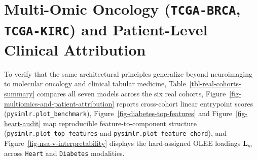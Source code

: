 \documentclass[
  10pt,
  letterpaper,
]{report}
\begin{document}
\section{\texorpdfstring{Multi-Omic Oncology (\texttt{TCGA-BRCA},
\texttt{TCGA-KIRC}) and Patient-Level Clinical
Attribution}{Multi-Omic Oncology (TCGA-BRCA, TCGA-KIRC) and Patient-Level Clinical Attribution}}\label{multi-omic-oncology-tcga-brca-tcga-kirc-and-patient-level-clinical-attribution}

To verify that the same architectural principles generalize beyond
neuroimaging to molecular oncology and clinical tabular medicine,
Table~\ref{tbl-real-cohorts-summary} compares all seven models across
the six real cohorts,
Figure~\ref{fig-multiomics-and-patient-attribution} reports cross-cohort
linear entrypoint scores (\texttt{pysimlr.plot\_benchmark}),
Figure~\ref{fig-diabetes-top-features} and Figure~\ref{fig-heart-audit}
map reproducible feature-to-component structure
(\texttt{pysimlr.plot\_top\_features} and
\texttt{pysimlr.plot\_feature\_chord}), and
Figure~\ref{fig-nsa-v-interpretability} displays the hard-assigned OLEE
loadings \(\mathbf{L}_m\) across \texttt{Heart} and \texttt{Diabetes}
modalities.
\end{document}
